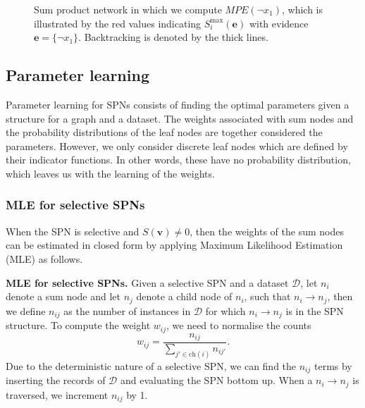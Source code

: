 \documentclass{article}
\begin{document}
\begin{figure}[H]
    \caption{Sum product network in which we compute $MPE(\neg x_1)$, which is illustrated by the red values indicating $S_i^{\text{max}}(\mathbf{e})$ with evidence $\mathbf{e} = \{\neg x_1\}$. Backtracking is denoted by the thick lines.}
    \label{fig:SPN3}
\end{figure}

\subsection{Parameter learning}
Parameter learning for SPNs consists of finding the optimal parameters given a structure for a graph and a dataset. The weights associated with sum nodes and the probability distributions of the leaf nodes are together considered the parameters. However, we only consider discrete leaf nodes which are defined by their indicator functions. In other words, these have no probability distribution, which leaves us with the learning of the weights. 

\subsubsection{MLE for selective SPNs}
When the SPN is selective and $S(\mathbf{v}) \neq 0$, then the weights of the sum nodes can be estimated in closed form by applying Maximum Likelihood Estimation (MLE) as follows. 
\\
\begin{theorem}
    \textbf{MLE for selective SPNs.} Given a selective SPN and a dataset $\mathcal{D}$, let $n_i$ denote a sum node and let $n_j$ denote a child node of $n_i$, such that $n_i \rightarrow n_j$, then we define $n_{ij}$ as the number of instances in $\mathcal{D}$ for which $n_i \rightarrow n_j$ is in the SPN structure. To compute the weight $w_{ij}$, we need to normalise the counts
    $$
        w_{ij} = \frac{n_{ij}}{\sum_{j' \in \text{ch}(i)} n_{ij'}} .
    $$
    Due to the deterministic nature of a selective SPN, we can find the $n_{ij}$ terms by inserting the records of $\mathcal{D}$ and evaluating the SPN bottom up. When a $n_i \rightarrow n_j$ is traversed, we increment $n_{ij}$ by 1. 
\end{theorem}
\end{document}
